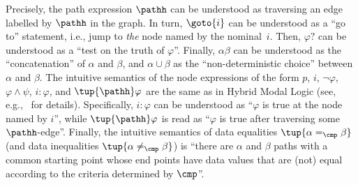 \documentclass[10pt,a4paper]{amsart}
\theoremstyle{definition}
\theoremstyle{remark}
\begin{document}
Precisely, the path expression $\pathh$ can be understood as traversing an edge labelled by $\pathh$ in the graph.
In turn, $\goto{i}$ can be understood as a ``go to'' statement, i.e., jump to \emph{the} node named by the nominal~$i$.
Then, $\varphi?$ can be understood as a ``test on the truth of $\varphi$''. %
Finally, $\alpha\beta$ can be understood as the ``concatenation'' of $\alpha$ and $\beta$, 
and $\alpha \cup \beta$ as the ``non-deterministic choice'' between $\alpha$ and $\beta$. %
The intuitive semantics of the node expressions of the form $p$, $i$, $\lnot\varphi$, $\varphi \land \psi$, $i{:}\varphi$, and $\tup{\pathh}\varphi$ are the same as in Hybrid Modal Logic (see, e.g.,~\cite{arec:hybr05b} for details). 
Specifically, %
$i{:}\varphi$ can be understood as ``$\varphi$ is true at the node named by $i$'', while $\tup{\pathh}\varphi$ is read as ``$\varphi$ is true after traversing some  $\pathh$-edge''.
Finally, the intuitive semantics of data equalities $\tup{\alpha =_{\cmp} \beta}$ (and data inequalities $\tup{\alpha \neq_{\cmp} \beta}$) is ``there are $\alpha$ and $\beta$ paths with a common starting point whose end points have data values that are (not) equal according to the criteria determined by $\cmp$''.
\end{document}
